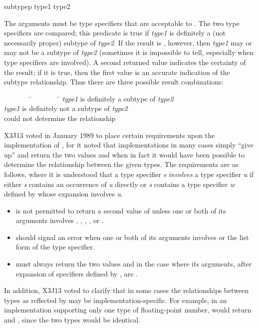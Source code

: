 \begin{defun}[Function]
subtypep type1 type2

The arguments must be type specifiers that are acceptable to .
The two type specifiers are compared; this predicate is true
if \emph{type1} is definitely a (not necessarily proper) subtype of \emph{type2}.
If the result is {\false}, however, then \emph{type1} may or may not be a subtype of
\emph{type2} (sometimes it is impossible to tell, especially when
 type specifiers are involved).
A second returned value indicates the certainty of the result;
if it is true, then the first value is an accurate indication
of the subtype relationship.  Thus there are three possible
result combinations:
\begin{tabbing}
~~~~~~~~\=~~~~~~~~\=\kill
{\true}\>{\true}\>\emph{type1} is definitely a subtype of \emph{type2} \\
{\false}\>{\true}\>\emph{type1} is definitely not a subtype of \emph{type2} \\
{\false}\>{\false}\> could not determine the relationship
\end{tabbing}

\begin{new}
X3J13 voted in January 1989
to place certain requirements upon the implementation of ,
for it noted that implementations in many cases simply ``give up''
and return the two values  and  when in fact it would have been
possible to determine the relationship between the given types.
The requirements are as follows, where it is understood that a type specifier \emph{s}
\emph{involves} a type specifier \emph{u} if either \emph{s} contains an occurrence of \emph{u}
directly or \emph{s} contains a type specifier \emph{w} defined by  whose
expansion involves \emph{u}.
\begin{itemize}
\item {} is not permitted to return a second value of 
unless one or both of its arguments involves ,
, , , or .
\item {} should signal an error when one or both of its arguments
involves  or the list form of the  type specifier.
\item {} must always return the two values  and 
in the case where its arguments, after expansion of specifiers
defined by , are .
\end{itemize}
In addition, X3J13 voted to clarify that in some cases
the relationships between types
as reflected by  may be implementation-specific.
For example, in an implementation supporting only one type of
floating-point number,  would return
 and , since the two types would be identical.


\end{new}
\end{defun}
